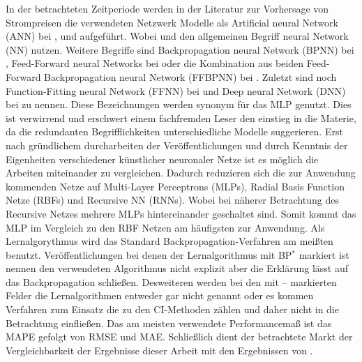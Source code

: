 In der betrachteten Zeitperiode werden in der Literatur zur Vorhersage von Strompreisen die verwendeten Netzwerk Modelle als Artificial neural Network (ANN) bei \citet{Mirakyan2017}, \citet{Gao2017} und \citet{Sandhu2016} aufgeführt. Wobei \citet{Davo2016} und \citet{Domanski2017} den allgemeinen Begriff neural Network (NN) nutzen. Weitere Begriffe sind Backpropagation neural Network (BPNN) bei \citet{Wang2017}, Feed-Forward neural Networks bei \citet{Keles2016} oder die Kombination aus beiden Feed-Forward Backpropagation neural Network (FFBPNN) bei \citet{Peter2016}. Zuletzt sind noch Function-Fitting neural Network (FFNN) bei \citet{Marcos2017} und Deep neural Network (DNN) bei \citet{Lago2018} zu nennen. Diese Bezeichnungen werden synonym für das MLP genutzt. Dies ist verwirrend und erschwert einem fachfremden Leser den einstieg in die Materie, da die redundanten Begrifflichkeiten unterschiedliche Modelle suggerieren. Erst nach gründlichem durcharbeiten der Veröffentlichungen und durch Kenntnis der Eigenheiten verschiedener künstlicher neuronaler Netze ist es möglich die Arbeiten miteinander zu vergleichen. Dadurch reduzieren sich die zur Anwendung kommenden Netze auf Multi-Layer Perceptrons (MLPs), Radial Basis Function Netze (RBFs) und Recursive NN (RNNs). Wobei bei näherer Betrachtung des Recursive Netzes mehrere MLPs hintereinander geschaltet sind. Somit kommt das MLP im Vergleich zu den RBF Netzen am häufigsten zur Anwendung. Als Lernalgorythmus wird das Standard Backpropagation-Verfahren am meißten benutzt. Veröffentlichungen bei denen der Lernalgorithmus mit BP$^{*}$ markiert ist nennen den verwendeten Algorithmus nicht explizit aber die Erklärung lässt auf das Backpropagation schließen. Desweiteren werden bei den mit -- markierten Felder die Lernalgorithmen entweder gar nicht genannt oder es kommen Verfahren zum Einsatz die zu den CI-Methoden zählen und daher nicht in die Betrachtung einfließen. Das am meisten verwendete Performancemaß ist das MAPE gefolgt von RMSE und MAE. Schließlich dient der betrachtete Markt der Vergleichbarkeit der Ergebnisse dieser Arbeit mit den Ergebnissen von \citet{Panapakidis2016}.









